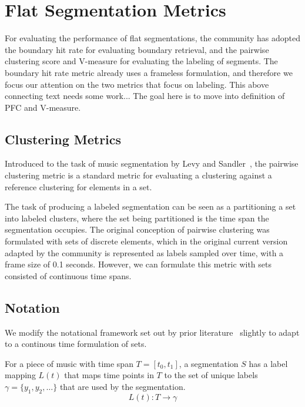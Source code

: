 
\section{Flat Segmentation Metrics}
For evaluating the performance of flat segmentations, the community has adopted the boundary hit rate for evaluating boundary retrieval, and the pairwise clustering score and V-measure for evaluating the labeling of segments.
The boundary hit rate metric already uses a frameless formulation, and therefore we focus our attention on the two metrics that focus on labeling.
This above connecting text needs some work...
The goal here is to move into definition of PFC and V-measure.

\subsection{Clustering Metrics}
Introduced to the task of music segmentation by Levy and Sandler~\cite{levy2008structural}, the pairwise clustering metric is a standard metric for evaluating a clustering against a reference clustering for elements in a set.

The task of producing a labeled segmentation can be seen as a partitioning a set into labeled clusters, where the set being partitioned is the time span the segmentation occupies.
The original conception of pairwise clustering was formulated with sets of discrete elements, which in the original current version adapted by the community is represented as labels sampled over time, with a frame size of 0.1 seconds.
However, we can formulate this metric with sets consisted of continuous time spans.

\subsection{Notation}
We modify the notational framework set out by prior literature~\cite{DBLP:journals/tismir/NietoMWSSGM20,DBLP:journals/tismir/KinnairdM21} slightly to adapt to a continous time formulation of sets.

For a piece of music with time span \(T = [t_0, t_1]\), a segmentation $S$ has a label mapping $L(t)$ that maps time points in $T$ to the set of unique labels $\gamma = \{y_1, y_2, \ldots\}$ that are used by the segmentation.
\begin{equation}
    L(t): T \to \gamma \label{eq:L}
\end{equation}


